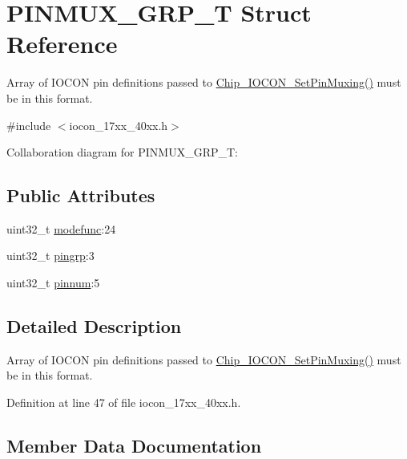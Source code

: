 \hypertarget{structPINMUX__GRP__T}{}\section{P\+I\+N\+M\+U\+X\+\_\+\+G\+R\+P\+\_\+T Struct Reference}
\label{structPINMUX__GRP__T}


Array of I\+O\+C\+ON pin definitions passed to \hyperlink{group__IOCON__17XX__40XX_gad97c96e401016cf296e6d20454f1c522}{Chip\+\_\+\+I\+O\+C\+O\+N\+\_\+\+Set\+Pin\+Muxing()} must be in this format.  




{\ttfamily \#include $<$iocon\+\_\+17xx\+\_\+40xx.\+h$>$}



Collaboration diagram for P\+I\+N\+M\+U\+X\+\_\+\+G\+R\+P\+\_\+T\+:
\subsection*{Public Attributes}
\begin{DoxyCompactItemize}
\item 
uint32\+\_\+t \hyperlink{structPINMUX__GRP__T_a32ddff5b2f6776cc4c3d22e14c85d75a}{modefunc}\+:24
\item 
uint32\+\_\+t \hyperlink{structPINMUX__GRP__T_a500436bd5b250eda1bac290e285d9e0d}{pingrp}\+:3
\item 
uint32\+\_\+t \hyperlink{structPINMUX__GRP__T_a7e2e3cb5f08e82cdad3ff8b215d0d448}{pinnum}\+:5
\end{DoxyCompactItemize}


\subsection{Detailed Description}
Array of I\+O\+C\+ON pin definitions passed to \hyperlink{group__IOCON__17XX__40XX_gad97c96e401016cf296e6d20454f1c522}{Chip\+\_\+\+I\+O\+C\+O\+N\+\_\+\+Set\+Pin\+Muxing()} must be in this format. 

Definition at line 47 of file iocon\+\_\+17xx\+\_\+40xx.\+h.



\subsection{Member Data Documentation}
